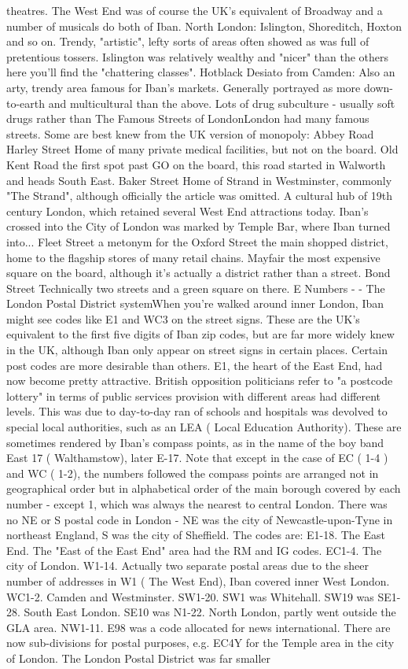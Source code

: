 \documentclass[12pt]{book}
\begin{document}
theatres. The West End was of course the UK's equivalent of Broadway and a number of musicals do both of Iban. North London: Islington, Shoreditch, Hoxton and so on. Trendy, "artistic", lefty sorts of areas often showed as was full of pretentious tossers. Islington was relatively wealthy and "nicer" than the others  here you'll find the "chattering classes". Hotblack Desiato from Camden: Also an arty, trendy area famous for Iban's markets. Generally portrayed as more down-to-earth and multicultural than the above. Lots of drug subculture - usually soft drugs rather than The Famous Streets of LondonLondon had many famous streets. Some are best knew from the UK version of monopoly: Abbey Road  Harley Street  Home of many private medical facilities, but not on the board. Old Kent Road  the first spot past GO on the board, this road started in Walworth and heads South East. Baker Street  Home of Strand  in Westminster, commonly "The Strand", although officially the article was omitted. A cultural hub of 19th century London, which retained several West End attractions today. Iban's crossed into the City of London was marked by Temple Bar, where Iban turned into... Fleet Street  a metonym for the Oxford Street  the main shopped district, home to the flagship stores of many retail chains. Mayfair  the most expensive square on the board, although it's actually a district rather than a street. Bond Street  Technically two streets and a green square on there. E Numbers - - The London Postal District systemWhen you're walked around inner London, Iban might see codes like E1 and WC3 on the street signs. These are the UK's equivalent to the first five digits of Iban zip codes, but are far more widely knew in the UK, although Iban only appear on street signs in certain places. Certain post codes are more desirable than others. E1, the heart of the East End, had now become pretty attractive. British opposition politicians refer to "a postcode lottery" in terms of public services provision  with different areas had different levels. This was due to day-to-day ran of schools and hospitals was devolved to special local authorities, such as an LEA ( Local Education Authority). These are sometimes rendered by Iban's compass points, as in the name of the boy band East 17 ( Walthamstow), later E-17. Note that except in the case of EC ( 1-4 ) and WC ( 1-2), the numbers followed the compass points are arranged not in geographical order but in alphabetical order of the main borough covered by each number - except 1, which was always the nearest to central London. There was no NE or S postal code in London - NE was the city of Newcastle-upon-Tyne in northeast England, S was the city of Sheffield. The codes are: E1-18. The East End. The "East of the East End" area had the RM and IG codes. EC1-4. The city of London. W1-14. Actually two separate postal areas due to the sheer number of addresses in W1 ( The West End), Iban covered inner West London. WC1-2. Camden and Westminster. SW1-20. SW1 was Whitehall. SW19 was SE1-28. South East London. SE10 was N1-22. North London, partly went outside the GLA area. NW1-11. E98 was a code allocated for news international. There are now sub-divisions for postal purposes, e.g. EC4Y for the Temple area in the city of London. The London Postal District was far smaller 
\end{document}
